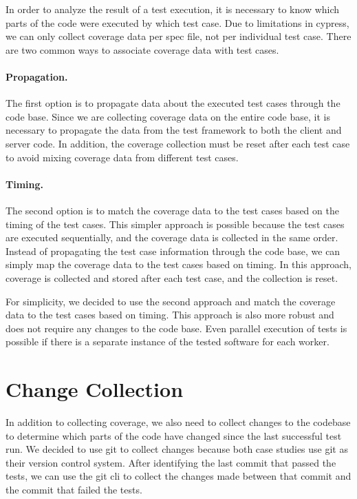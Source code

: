 In order to analyze the result of a test execution, it is necessary to know which parts of the code were executed by which test case.
Due to limitations in cypress, we can only collect coverage data per spec file, not per individual test case.
There are two common ways to associate coverage data with test cases.

\paragraph{Propagation.} The first option is to propagate data about the executed test cases through the code base.
Since we are collecting coverage data on the entire code base, it is necessary to propagate the data from the test framework to both the client and server code.
In addition, the coverage collection must be reset after each test case to avoid mixing coverage data from different test cases.

\paragraph{Timing.} The second option is to match the coverage data to the test cases based on the timing of the test cases.
This simpler approach is possible because the test cases are executed sequentially, and the coverage data is collected in the same order.
Instead of propagating the test case information through the code base, we can simply map the coverage data to the test cases based on timing.
In this approach, coverage is collected and stored after each test case, and the collection is reset.

For simplicity, we decided to use the second approach and match the coverage data to the test cases based on timing.
This approach is also more robust and does not require any changes to the code base.
Even parallel execution of tests is possible if there is a separate instance of the tested software for each worker.
\section{Change Collection}

In addition to collecting coverage, we also need to collect changes to the codebase to determine which parts of the code have changed since the last successful test run.
We decided to use git to collect changes because both case studies use git as their version control system.
After identifying the last commit that passed the tests, we can use the git \ac{cli} to collect the changes made between that commit and the commit that failed the tests.

